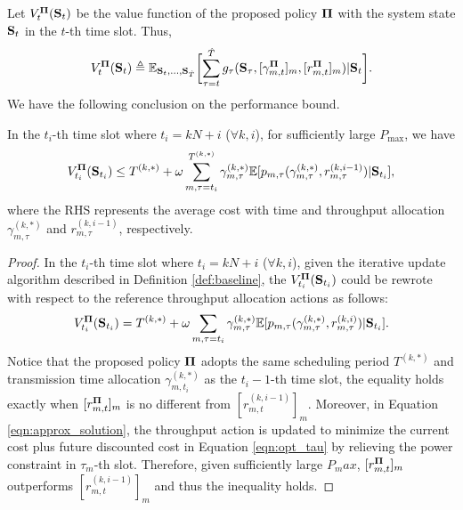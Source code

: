 Let $V^{\mathbf{\Pi}}_{t}(\mathbf{S}_{t})$ be the value function of the proposed policy $\mathbf{\Pi}$ with the system state $\mathbf{S}_{t}$ in the $t$-th time slot. Thus,
\begin{align}
    V^{\Baseline}_{t}(\Stat_{t}) \define  \mathbb{E}_{\Stat_{t},\dots,\Stat_{\T}}
    \Bracket{
        \sum_{\tau=t}^{\T} g_{\tau}\paren{ \Stat_{\tau}, [ \gamma^{\Baseline}_{m,t}]_m, [r^{\Baseline}_{m,t}]_m} | \Stat_{t}
    }.
    \label{eqn:val_baseline}
\end{align}
We have the following conclusion on the performance bound.
\begin{theorem}
    \label{lemma:performance_analysis}
    In the $t_i$-th time slot where $t_i=kN+i$ ($\forall k,i$),
    for sufficiently large $P_{\max}$,
    we have
    \begin{align}
        V^{\mathbf{\Pi}}_{t_i}(\mathbf{S}_{t_i}) \leq T^{(k,*)} + \omega \sum_{m,\tau=t_i}^{T^{(k,*)}} \gamma^{(k,*)}_{m,\tau} \mathbb{E}[ p_{m,\tau}( \gamma^{(k,*)}_{m,\tau}, r^{(k,i-1)}_{m,\tau} ) | \mathbf{S}_{t_i} ], \nonumber
    \end{align}
    where the RHS represents the average cost with time and throughput allocation $\gamma^{(k,*)}_{m,\tau}$ and $r^{(k,i-1)}_{m,\tau}$, respectively.
\end{theorem}
\begin{proof}
    In the $t_i$-th time slot where $t_i=kN+i$ ($\forall k,i$), given the iterative update algorithm described in Definition \ref{def:baseline}, the $V^{\mathbf{\Pi}}_{t_i}(\mathbf{S}_{t_i})$ could be rewrote with respect to the reference throughput allocation actions as follows:
    \begin{align*}
        V^{\mathbf{\Pi}}_{t_i}(\mathbf{S}_{t_i}) = 
        T^{(k,*)} + \omega \sum_{m,\tau=t_i} \gamma^{(k,*)}_{m,\tau} \mathbb{E}[ p_{m,\tau}( \gamma^{(k,*)}_{m,\tau}, r^{(k,i)}_{m,\tau} ) | \mathbf{S}_{t_i} ].
    \end{align*}
    Notice that the proposed policy $\mathbf{\Pi}$ adopts the same scheduling period $T^{(k,*)}$ and transmission time allocation $\gamma^{(k,*)}_{m,t_i}$ as the $t_i-1$-th time slot,
    the equality holds exactly when $[r^{\mathbf{\Pi}}_{m,t}]_m$ is no different from $[r^{(k,i-1)}_{m,t}]_m$.
    Moreover, in Equation \eqref{eqn:approx_solution}, the throughput action is updated to minimize the current cost plus future discounted cost in Equation \eqref{eqn:opt_tau} by relieving the power constraint in $\tau_m$-th slot.
    Therefore, given sufficiently large $P_max$, $[r^{\mathbf{\Pi}}_{m,t}]_m$ outperforms $[r^{(k,i-1)}_{m,t}]_m$ and thus the inequality holds.
\end{proof}


